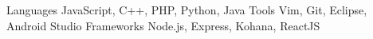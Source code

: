 \begin{cvskills}
  \cvskill
    {Languages}
    {
	JavaScript, C++, PHP, Python, Java
    }
  \cvskill
    {Tools}
    {
        Vim, Git, Eclipse, Android Studio
    }
\cvskill
    {Frameworks}
    {
	 Node.js, Express, Kohana, ReactJS
    }
	
\end{cvskills}


